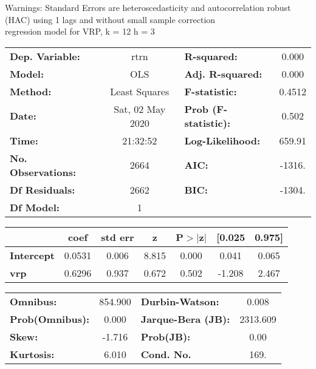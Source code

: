 Warnings: \newline
 [1] Standard Errors are heteroscedasticity and autocorrelation robust (HAC) using 1 lags and without small sample correction\\ 

regression model for VRP, k = 12 h = 3\begin{center}
\begin{tabular}{lclc}
\toprule
\textbf{Dep. Variable:}    &       rtrn       & \textbf{  R-squared:         } &     0.000   \\
\textbf{Model:}            &       OLS        & \textbf{  Adj. R-squared:    } &     0.000   \\
\textbf{Method:}           &  Least Squares   & \textbf{  F-statistic:       } &    0.4512   \\
\textbf{Date:}             & Sat, 02 May 2020 & \textbf{  Prob (F-statistic):} &    0.502    \\
\textbf{Time:}             &     21:32:52     & \textbf{  Log-Likelihood:    } &    659.91   \\
\textbf{No. Observations:} &        2664      & \textbf{  AIC:               } &    -1316.   \\
\textbf{Df Residuals:}     &        2662      & \textbf{  BIC:               } &    -1304.   \\
\textbf{Df Model:}         &           1      & \textbf{                     } &             \\
\bottomrule
\end{tabular}
\begin{tabular}{lcccccc}
                   & \textbf{coef} & \textbf{std err} & \textbf{z} & \textbf{P$> |$z$|$} & \textbf{[0.025} & \textbf{0.975]}  \\
\midrule
\textbf{Intercept} &       0.0531  &        0.006     &     8.815  &         0.000        &        0.041    &        0.065     \\
\textbf{vrp}       &       0.6296  &        0.937     &     0.672  &         0.502        &       -1.208    &        2.467     \\
\bottomrule
\end{tabular}
\begin{tabular}{lclc}
\textbf{Omnibus:}       & 854.900 & \textbf{  Durbin-Watson:     } &    0.008  \\
\textbf{Prob(Omnibus):} &   0.000 & \textbf{  Jarque-Bera (JB):  } & 2313.609  \\
\textbf{Skew:}          &  -1.716 & \textbf{  Prob(JB):          } &     0.00  \\
\textbf{Kurtosis:}      &   6.010 & \textbf{  Cond. No.          } &     169.  \\
\bottomrule
\end{tabular}
\end{center}

